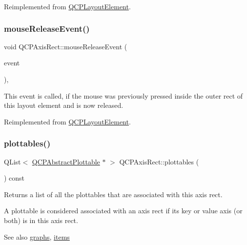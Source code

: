 Reimplemented from \hyperlink{class_q_c_p_layout_element_a2d82ea21fe0ee628f177bd824bc51a71}{Q\+C\+P\+Layout\+Element}.

\hypertarget{class_q_c_p_axis_rect_adf6c99780cea55ab39459a6eaad3a94a}{}\label{class_q_c_p_axis_rect_adf6c99780cea55ab39459a6eaad3a94a} 
\subsubsection{\texorpdfstring{mouse\+Release\+Event()}{mouseReleaseEvent()}}
{\footnotesize\ttfamily void Q\+C\+P\+Axis\+Rect\+::mouse\+Release\+Event (\begin{DoxyParamCaption}\item[{Q\+Mouse\+Event $\ast$}]{event }\end{DoxyParamCaption})\hspace{0.3cm}{\ttfamily [protected]}, {\ttfamily [virtual]}}

This event is called, if the mouse was previously pressed inside the outer rect of this layout element and is now released. 

Reimplemented from \hyperlink{class_q_c_p_layout_element_ae526ac828cce1e5bb94eaa85776d7404}{Q\+C\+P\+Layout\+Element}.

\hypertarget{class_q_c_p_axis_rect_a587d073a97b27bc7293fab4b2774ad59}{}\label{class_q_c_p_axis_rect_a587d073a97b27bc7293fab4b2774ad59} 
\subsubsection{\texorpdfstring{plottables()}{plottables()}}
{\footnotesize\ttfamily Q\+List$<$ \hyperlink{class_q_c_p_abstract_plottable}{Q\+C\+P\+Abstract\+Plottable} $\ast$ $>$ Q\+C\+P\+Axis\+Rect\+::plottables (\begin{DoxyParamCaption}{ }\end{DoxyParamCaption}) const}

Returns a list of all the plottables that are associated with this axis rect.

A plottable is considered associated with an axis rect if its key or value axis (or both) is in this axis rect.

\begin{DoxySeeAlso}{See also}
\hyperlink{class_q_c_p_axis_rect_a2d9ded3eca97be1fcb5867949391bb88}{graphs}, \hyperlink{class_q_c_p_axis_rect_a03c113a2175448300ee8f944e24776ba}{items} 
\end{DoxySeeAlso}
\hypertarget{class_q_c_p_axis_rect_a6d7c22cfc54fac7a3d6ef80b133a8574}{}\label{class_q_c_p_axis_rect_a6d7c22cfc54fac7a3d6ef80b133a8574} 
